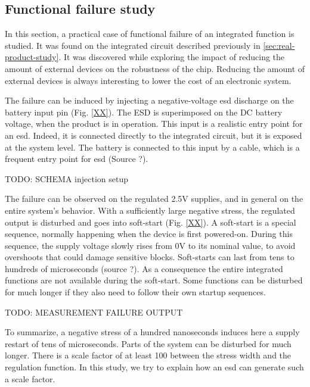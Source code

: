 \subsection{Functional failure study}
\label{sec:failure-case-study}

In this section, a practical case of functional failure of an integrated function is studied.
It was found on the integrated circuit described previously in \ref{sec:real-product-study}.
It was discovered while exploring the impact of reducing the amount of external devices on the robustness of the chip.
Reducing the amount of external devices is always interesting to lower the cost of an electronic system.

The failure can be induced by injecting a negative-voltage \gls{esd} discharge on the battery input pin (Fig. \ref{XX}).
The \gls{ESD} is superimposed on the DC battery voltage, when the product is in operation.
This input is a realistic entry point for an \gls{esd}.
Indeed, it is connected directly to the integrated circuit, but it is exposed at the system level.
The battery is connected to this input by a cable, which is a frequent entry point for \gls{esd} (Source ?).

TODO: SCHEMA injection setup

The failure can be observed on the regulated 2.5V supplies, and in general on the entire system's behavior.
With a sufficiently large negative stress, the regulated output is disturbed and goes into soft-start (Fig. \ref{XX}).
A soft-start is a special sequence, normally happening when the device is first powered-on.
During this sequence, the supply voltage slowly rises from 0V to its nominal value, to avoid overshoots that could damage sensitive blocks.
Soft-starts can last from tens to hundreds of microseconds (source ?).
As a consequence the entire integrated functions are not available during the soft-start.
Some functions can be disturbed for much longer if they also need to follow their own startup sequences.

TODO: MEASUREMENT FAILURE OUTPUT

To summarize, a negative stress of a hundred nanoseconds induces here a supply restart of tens of microseconds.
Parts of the system can be disturbed for much longer.
There is a scale factor of at least 100 between the stress width and the regulation function.
In this study, we try to explain how an \gls{esd} can generate such a scale factor.

